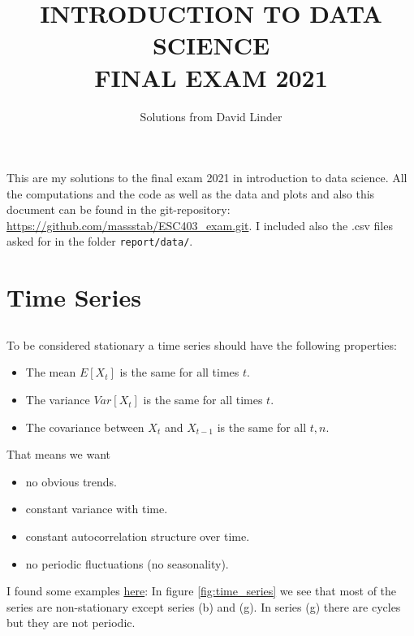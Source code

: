 \documentclass[]{article}
\title{\textbf{\normalsize INTRODUCTION TO DATA SCIENCE \\ \Large FINAL EXAM 2021}}
\author{Solutions from David Linder}
\begin{document}
	\maketitle
	\thispagestyle{fancy}
	This are my solutions to the final exam 2021 in introduction to data science. All the computations and the code as well as the data and plots and also this document can be found in the git-repository: \href{https://github.com/massstab/ESC403_exam.git}{https://github.com/massstab/ESC403\_exam.git}. I included also the .csv files asked for in the folder \texttt{report/data/}.
	\section{Time Series}
	\subsection{}
	To be considered stationary a time series should have the following properties:
	\begin{itemize}
		\item The mean $E[X_t]$ is the same for all times $t$.
		\item The variance $Var[X_t]$ is the same for all times $t$.
		\item The covariance between $X_t$ and $X_{t-1}$ is the same for all $t, n$.
	\end{itemize}
	That means we want
	\begin{itemize}
		\item no obvious trends.
		\item constant variance with time.
		\item constant autocorrelation structure over time.
		\item no periodic fluctuations (no seasonality).
	\end{itemize}
	I found some examples \href{https://otexts.com/fpp2/stationarity.html}{here}: In figure \ref{fig:time_series} we see that most of the series are non-stationary except series (b) and (g). In series (g) there are cycles but they are not periodic. 
\end{document}
